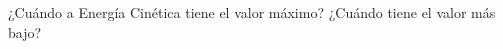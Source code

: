 ¿Cuándo a Energía Cinética tiene el valor máximo? ¿Cuándo tiene el valor más bajo?

\begin{solutionbox}{1.8cm}

\end{solutionbox}

